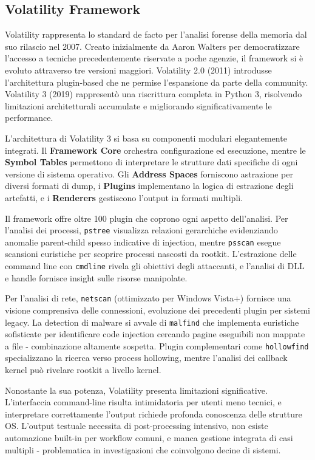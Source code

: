 \subsection{Volatility Framework}

Volatility \cite{volatility2024} rappresenta lo standard de facto per l'analisi forense della memoria dal suo rilascio nel 2007. Creato inizialmente da Aaron Walters per democratizzare l'accesso a tecniche precedentemente riservate a poche agenzie, il framework si è evoluto attraverso tre versioni maggiori. Volatility 2.0 (2011) introdusse l'architettura plugin-based che ne permise l'espansione da parte della community. Volatility 3 (2019) rappresentò una riscrittura completa in Python 3, risolvendo limitazioni architetturali accumulate e migliorando significativamente le performance.

L'architettura di Volatility 3 si basa su componenti modulari elegantemente integrati. Il \textbf{Framework Core} orchestra configurazione ed esecuzione, mentre le \textbf{Symbol Tables} permettono di interpretare le strutture dati specifiche di ogni versione di sistema operativo. Gli \textbf{Address Spaces} forniscono astrazione per diversi formati di dump, i \textbf{Plugins} implementano la logica di estrazione degli artefatti, e i \textbf{Renderers} gestiscono l'output in formati multipli.

Il framework offre oltre 100 plugin che coprono ogni aspetto dell'analisi. Per l'analisi dei processi, \texttt{pstree} visualizza relazioni gerarchiche evidenziando anomalie parent-child spesso indicative di injection, mentre \texttt{psscan} esegue scansioni euristiche per scoprire processi nascosti da rootkit. L'estrazione delle command line con \texttt{cmdline} rivela gli obiettivi degli attaccanti, e l'analisi di DLL e handle fornisce insight sulle risorse manipolate.

Per l'analisi di rete, \texttt{netscan} (ottimizzato per Windows Vista+) fornisce una visione comprensiva delle connessioni, evoluzione dei precedenti plugin per sistemi legacy. La detection di malware si avvale di \texttt{malfind} che implementa euristiche sofisticate per identificare code injection cercando pagine eseguibili non mappate a file - combinazione altamente sospetta. Plugin complementari come \texttt{hollowfind} specializzano la ricerca verso process hollowing, mentre l'analisi dei callback kernel può rivelare rootkit a livello kernel.

Nonostante la sua potenza, Volatility presenta limitazioni significative. L'interfaccia command-line risulta intimidatoria per utenti meno tecnici, e interpretare correttamente l'output richiede profonda conoscenza delle strutture OS. L'output testuale necessita di post-processing intensivo, non esiste automazione built-in per workflow comuni, e manca gestione integrata di casi multipli - problematica in investigazioni che coinvolgono decine di sistemi.

